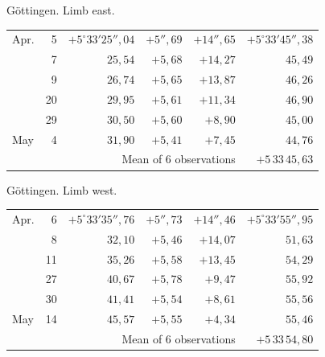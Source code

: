 \noindent\begin{minipage}[t]{.495\textwidth}\centering Göttingen. Limb east.\par\smallskip
{\scriptsize\setlength{\tabcolsep}{1pt}\renewcommand{\arraystretch}{1.2}\begin{tabular}{lr|r|r|r|r|}
Apr.&5&$+5^\circ33'25''{,}04$&$+5''{,}69$&$+14''{,}65$&$+5^\circ33'45''{,}38$\\
&7&$25{,}54$&$+5{,}68$&$+14{,}27$&$45{,}49$\\
&9&$26{,}74$&$+5{,}65$&$+13{,}87$&$46{,}26$\\
&20&$29{,}95$&$+5{,}61$&$+11{,}34$&$46{,}90$\\
&29&$30{,}50$&$+5{,}60$&$+8{,}90$&$45{,}00$\\
May&4&$31{,}90$&$+5{,}41$&$+7{,}45$&$44{,}76$\\
\cline{6-6}\multicolumn{5}{r}{Mean of 6 observations}&$+5\,33\,45{,}63$
\end{tabular}}\end{minipage}\hfill\begin{minipage}[t]{.495\textwidth}\centering Göttingen. Limb west.\par\smallskip
{\scriptsize\setlength{\tabcolsep}{1pt}\renewcommand{\arraystretch}{1.2}\begin{tabular}{lr|r|r|r|r}
Apr.&6&$+5^\circ33'35''{,}76$&$+5''{,}73$&$+14''{,}46$&$+5^\circ33'55''{,}95$\\
&8&$32{,}10$&$+5{,}46$&$+14{,}07$&$51{,}63$\\
&11&$35{,}26$&$+5{,}58$&$+13{,}45$&$54{,}29$\\
&27&$40{,}67$&$+5{,}78$&$+9{,}47$&$55{,}92$\\
&30&$41{,}41$&$+5{,}54$&$+8{,}61$&$55{,}56$\\
May&14&$45{,}57$&$+5{,}55$&$+4{,}34$&$55{,}46$\\
\cline{6-6}\multicolumn{5}{r}{Mean of 6 observations}&$+5\,33\,54{,}80$
\end{tabular}}\end{minipage}
\par\vspace{4mm}


